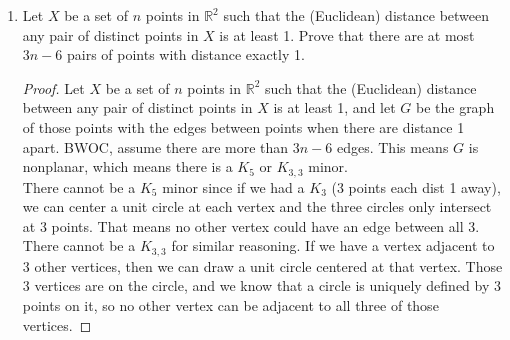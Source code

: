 \documentclass[12pt]{article}
\begin{document}
\begin{enumerate}
\medskip

\item Let $X$ be a set of $n$ points in $\mathbb R^2$ such that the (Euclidean) distance between any pair of distinct points in $X$ is at least 1. Prove that there are at most $3n-6$ pairs of points with distance exactly 1. 

\begin{proof}
	Let $X$ be a set of $n$ points in $\mathbb R^2$ such that the (Euclidean) distance between any pair of distinct points in $X$ is at least 1, and let $G$ be the graph of those points with the edges between points when there are distance 1 apart. BWOC, assume there are more than $3n-6$ edges. This means $G$ is nonplanar, which means there is a $K_5$ or $K_{3,3}$ minor.\\
	There cannot be a $K_5$ minor since if we had a $K_3$ (3 points each dist 1 away), we can center a unit circle at each vertex and the three circles only intersect at 3 points. That means no other vertex could have an edge between all 3.\\
	There cannot be a $K_{3,3}$ for similar reasoning. If we have a vertex adjacent to 3 other vertices, then we can draw a unit circle centered at that vertex. Those 3 vertices are on the circle, and we know that a circle is uniquely defined by 3 points on it, so no other vertex can be adjacent to all three of those vertices.
\end{proof}


\end{enumerate}
\end{document}
